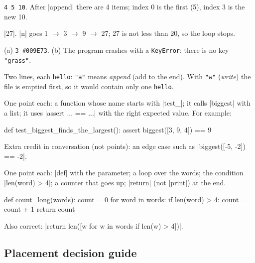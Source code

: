 \begin{answer}
\texttt{4 5 10}. After \py|append| there are 4 items; index 0 is the first (5), index 3 is the new 10.
\end{answer}

\begin{answer}
\py|27|. \py|n| goes 1 $\rightarrow$ 3 $\rightarrow$ 9 $\rightarrow$ 27; 27 is not less than 20,
so the loop stops.
\end{answer}

\begin{answer}
(a) \texttt{3 \#009E73}. (b) The program crashes with a \texttt{KeyError}: there is no key
\texttt{"grass"}.
\end{answer}

\begin{answer}
Two lines, each \texttt{hello}: \texttt{"a"} means \emph{append} (add to the end). With
\texttt{"w"} (\emph{write}) the file is emptied first, so it would contain only one
\texttt{hello}.
\end{answer}

\begin{answer}
One point each: a function whose name starts with \py|test_|; it calls \py|biggest| with a list;
it uses \py|assert ... == ...| with the right expected value. For example:
\begin{pycode}
def test_biggest_finds_the_largest():
    assert biggest([3, 9, 4]) == 9
\end{pycode}
Extra credit in conversation (not points): an edge case such as \py|biggest([-5, -2]) == -2|.
\end{answer}

\begin{answer}
One point each: \py|def| with the parameter; a loop over the words; the condition
\py|len(word) > 4|; a counter that goes up; \py|return| (not \py|print|) at the end.
\begin{pycode}
def count_long(words):
    count = 0
    for word in words:
        if len(word) > 4:
            count = count + 1
    return count
\end{pycode}
Also correct: \py|return len([w for w in words if len(w) > 4])|.
\end{answer}

\subsection{Placement decision guide}

